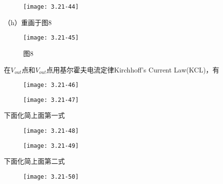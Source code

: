 \begin{figure}[H] %
	\begin{minipage}{\linewidth}
		\texttt{[image: 3.21-44]}
	\end{minipage}
\end{figure}

\scalebox{3}{（h）}

（h）重画于图8

\begin{figure}[H] %
	\begin{minipage}{\linewidth}
		\texttt{[image: 3.21-45]}
	\end{minipage}
	\caption*{图8} %
\end{figure}

在$V_{out}$点和$V_{out}$点用基尔霍夫电流定律Kirchhoff’s Current Law(KCL)，有

\begin{figure}[H] %
	\begin{minipage}{\linewidth}
		\texttt{[image: 3.21-46]}
	\end{minipage}
\end{figure}

\begin{figure}[H] %
	\begin{minipage}{\linewidth}
		\texttt{[image: 3.21-47]}
	\end{minipage}
\end{figure}

下面化简上面第一式

\begin{figure}[H] %
	\begin{minipage}{\linewidth}
		\texttt{[image: 3.21-48]}
	\end{minipage}
\end{figure}

\begin{figure}[H] %
	\begin{minipage}{\linewidth}
		\texttt{[image: 3.21-49]}
	\end{minipage}
\end{figure}

下面化简上面第二式

\begin{figure}[H] %
	\begin{minipage}{\linewidth}
		\texttt{[image: 3.21-50]}
	\end{minipage}
\end{figure}

